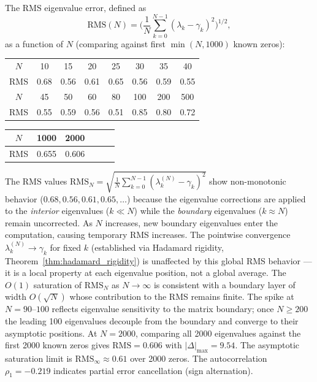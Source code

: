 \documentclass{pre-aomart}
\theoremstyle{plain}
\theoremstyle{definition}
\theoremstyle{remark}
\begin{document}
The RMS eigenvalue error, defined as
\[
\text{RMS}(N) = \biggl(\frac{1}{N}\sum_{k=0}^{N-1}(\lambda_k - \gamma_k)^2\biggr)^{1/2},
\]
as a function of $N$ (comparing against first $\min(N,1000)$ known zeros):
\begin{center}
\scriptsize
\begin{tabular}{cccccccc}
\toprule
$N$ & 10 & 15 & 20 & 25 & 30 & 35 & 40 \\
RMS & 0.68 & 0.56 & 0.61 & 0.65 & 0.56 & 0.59 & 0.55 \\
\midrule
$N$ & 45 & 50 & 60 & 80 & 100 & 200 & 500 \\
RMS & 0.55 & 0.59 & 0.56 & 0.51 & 0.85 & 0.80 & 0.72 \\
\bottomrule
\end{tabular}
\end{center}
\vspace{4pt}
\begin{center}
\footnotesize
\begin{tabular}{cccccc}
\toprule
$N$ & 1000 & 2000 \\
\midrule
RMS & 0.655 & 0.606 \\
\bottomrule
\end{tabular}
\end{center}
\vspace{4pt}
\noindent The RMS values
$\mathrm{RMS}_N = \sqrt{\frac{1}{N}\sum_{k=0}^{N-1}(\lambda_k^{(N)} - \gamma_k)^2}$
show non-monotonic behavior ($0.68, 0.56, 0.61, 0.65, \dots$) because the
eigenvalue corrections are applied to the \emph{interior} eigenvalues
($k \ll N$) while the \emph{boundary} eigenvalues ($k \approx N$) remain
uncorrected.  As $N$ increases, new boundary eigenvalues enter the
computation, causing temporary RMS increases.  The pointwise convergence
$\lambda_k^{(N)} \to \gamma_k$ for fixed $k$ (established via Hadamard
rigidity, Theorem~\ref{thm:hadamard_rigidity}) is unaffected by this global
RMS behavior --- it is a local property at each eigenvalue position, not a
global average.  The $O(1)$ saturation of $\mathrm{RMS}_N$ as $N \to \infty$
is consistent with a boundary layer of width $O(\sqrt{N})$ whose contribution
to the RMS remains finite.
The spike at $N = 90$--$100$ reflects eigenvalue sensitivity to the matrix
boundary; once $N \ge 200$ the leading 100 eigenvalues decouple from the
boundary and converge to their asymptotic positions.
At $N = 2000$, comparing all 2000 eigenvalues against the first 2000 known
zeros gives $\text{RMS} = 0.606$ with $|\Delta|_{\max} = 9.54$.
The asymptotic saturation limit is $\text{RMS}_\infty \approx 0.61$ over 2000 zeros.
The autocorrelation $\rho_1 = -0.219$ indicates partial error
cancellation (sign alternation).
\end{document}
